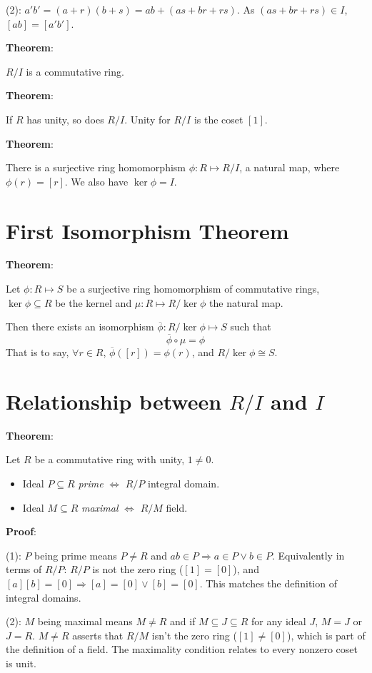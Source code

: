 \documentclass{article}
\begin{document}
\begin{multicols*}{2}
(2): $a'b' = (a+r)(b+s) = ab + (as + br + rs)$. As $(as + br + rs) \in I$, $[ab] = [a'b']$.

\textbf{Theorem}:

$R/I$ is a commutative ring.

\textbf{Theorem}:

If $R$ has unity, so does $R/I$. Unity for $R/I$ is the coset $[1]$.

\textbf{Theorem}:

There is a surjective ring homomorphism $\phi: R \mapsto R/I$, a natural map, where $\phi(r) = [r]$. We also have $\ker \phi = I$.

\section{First Isomorphism Theorem}

\textbf{Theorem}:

Let $\phi : R \mapsto S$ be a surjective ring homomorphism of commutative rings, $\ker \phi \subseteq R$ be the kernel and $\mu : R \mapsto R/\ker \phi$ the natural map.

Then there exists an isomorphism $\overline{\phi}: R/\ker\phi \mapsto S$ such that \[\overline{\phi} \circ \mu = \phi\] That is to say, $\forall r \in R$, $\overline{\phi}([r]) = \phi(r)$, and $R/\ker\phi \cong S$.

\section{Relationship between $R/I$ and $I$}

\textbf{Theorem}:

Let $R$ be a commutative ring with unity, $1 \neq 0$.

\begin{itemize}
    \item Ideal $P \subseteq R$ \textit{prime} $\Leftrightarrow$ $R/P$ integral domain.
    \item Ideal $M \subseteq R$ \textit{maximal} $\Leftrightarrow$ $R/M$ field.
\end{itemize}

\textbf{Proof}:

(1): $P$ being prime means $P \neq R$ and $ab \in P \Rightarrow a \in P \vee b \in P$. Equivalently in terms of $R/P$: $R/P$ is not the zero ring  ($[1] = [0]$), and $[a][b]=[0] \Rightarrow [a]=[0] \vee [b]=[0]$. This matches the definition of integral domains.

(2): $M$ being maximal means $M \neq R$ and if $M \subseteq J \subseteq R$ for any ideal $J$, $M = J$ or $J = R$. $M \neq R$ asserts that $R/M$ isn't the zero ring ($[1] \neq [0]$), which is part of the definition of a field. The maximality condition relates to every nonzero coset is unit.


\end{multicols*}
\end{document}
